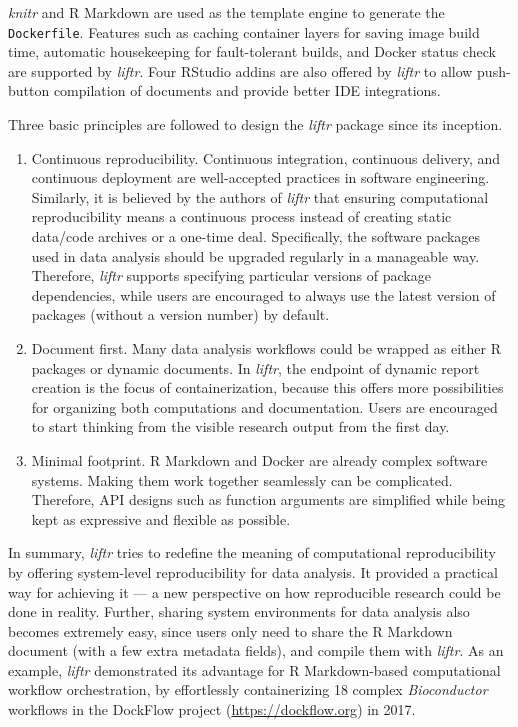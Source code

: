 \emph{knitr} and R Markdown are used as the template engine to generate
the \texttt{Dockerfile}. Features such as caching container layers for
saving image build time, automatic housekeeping for fault-tolerant
builds, and Docker status check are supported by \emph{liftr}. Four
RStudio addins are also offered by \emph{liftr} to allow push-button
compilation of documents and provide better IDE integrations.

Three basic principles are followed to design the \emph{liftr} package
since its inception.

\begin{enumerate}
\def\labelenumi{\arabic{enumi}.}
\item
  Continuous reproducibility. Continuous integration, continuous
  delivery, and continuous deployment are well-accepted practices in
  software engineering. Similarly, it is believed by the authors of
  \emph{liftr} that ensuring computational reproducibility means a
  continuous process instead of creating static data/code archives or a
  one-time deal. Specifically, the software packages used in data
  analysis should be upgraded regularly in a manageable way. Therefore,
  \emph{liftr} supports specifying particular versions of package
  dependencies, while users are encouraged to always use the latest
  version of packages (without a version number) by default.
\item
  Document first. Many data analysis workflows could be wrapped as
  either R packages or dynamic documents. In \emph{liftr}, the endpoint
  of dynamic report creation is the focus of containerization, because
  this offers more possibilities for organizing both computations and
  documentation. Users are encouraged to start thinking from the visible
  research output from the first day.
\item
  Minimal footprint. R Markdown and Docker are already complex software
  systems. Making them work together seamlessly can be complicated.
  Therefore, API designs such as function arguments are simplified while
  being kept as expressive and flexible as possible.
\end{enumerate}

In summary, \emph{liftr} tries to redefine the meaning of computational
reproducibility by offering system-level reproducibility for data
analysis. It provided a practical way for achieving it --- a new
perspective on how reproducible research could be done in reality.
Further, sharing system environments for data analysis also becomes
extremely easy, since users only need to share the R Markdown document
(with a few extra metadata fields), and compile them with \emph{liftr}.
As an example, \emph{liftr} demonstrated its advantage for R
Markdown-based computational workflow orchestration, by effortlessly
containerizing 18 complex \emph{Bioconductor} workflows in the DockFlow
project (\url{https://dockflow.org}) in 2017.

